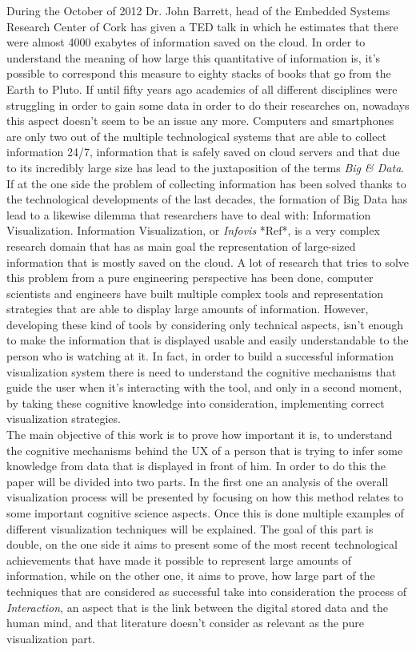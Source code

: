 \documentclass[10p,letterpaper]{article}
\begin{document}
During the October of 2012 Dr. John Barrett, head of the Embedded Systems Research Center of Cork has given a TED talk in which he estimates that there were almost 4000 exabytes 
of information saved on the cloud. In order to understand the meaning of how large this quantitative of information is, it's possible to correspond this measure to eighty stacks of books that go from the Earth to Pluto. If until fifty years ago academics of all different disciplines were struggling in order to gain some data in order to do their researches on, nowadays this aspect doesn't seem to be an issue any more. Computers and smartphones are only two out of the multiple technological systems that are able to collect information 24/7, information that is safely saved on cloud servers and that due to its incredibly large size has lead to the juxtaposition of the terms \textit{Big \& Data}.\\
If at the one side the problem of collecting information has been solved thanks to the technological developments of the last decades, the formation of Big Data has lead to a likewise dilemma that researchers have to deal with: Information Visualization. Information Visualization, or \textit{Infovis} *Ref*, is a very complex research domain that has as main goal the representation of large-sized information that is mostly saved on the cloud. A lot of research that tries to solve this problem from a pure engineering perspective has been done, computer scientists and engineers have built multiple complex tools and representation strategies that are able to display large amounts of information. However, developing these kind of tools by considering only technical aspects, isn't enough to make the information that is displayed usable and easily understandable to the person who is watching at it. In fact, in order to build a successful information visualization system there is need to understand the cognitive mechanisms that guide the user when it's interacting with the tool, and only in a second moment, by taking these cognitive knowledge into consideration, implementing correct visualization strategies.\\
The main objective of this work is to prove how important it is, to understand the cognitive mechanisms behind the UX of a person that is trying to infer some knowledge from data that is displayed in front of him. In order to do this the paper will be divided into two parts. In the first one an analysis of the overall visualization process will be presented by focusing on how this method relates to some important cognitive science aspects. Once this is done multiple examples of different visualization techniques will be explained. The goal of this part is double, on the one side it aims to present some of the most recent technological achievements that have made it possible to represent large amounts of information, while on the other one, it aims to prove, how large part of the techniques that are considered as successful take into consideration the process of \textit{Interaction}, an aspect that is the link between the digital stored data and the human mind, and that literature doesn't consider as relevant as the pure visualization part.
\end{document}
